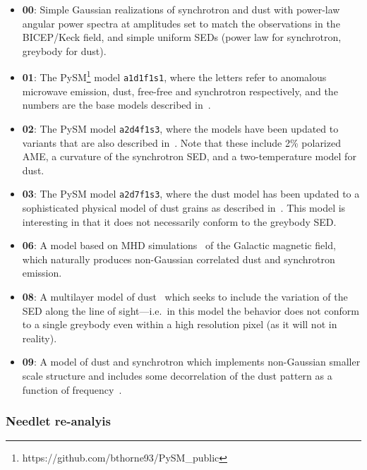 \documentclass[PICOReport.tex]{subfiles}
\begin{document}
\begin{itemize}

\item {\bf 00}: Simple Gaussian realizations of synchrotron and dust with power-law angular power spectra at amplitudes set to match the observations in the BICEP/Keck field, and simple uniform SEDs (power law for synchrotron, greybody for dust).

\item {\bf 01}: The PySM\footnote{https://github.com/bthorne93/PySM\_public} model {\tt a1d1f1s1}, where the letters refer to anomalous microwave emission, dust, free-free and synchrotron respectively, and the numbers are the base models described in~\cite{Thorne:2016ifb}.

\item {\bf 02}: The PySM model {\tt a2d4f1s3}, where the models have been updated to variants that are also described in~\cite{Thorne:2016ifb}.  Note that these include 2\% polarized AME, a curvature of the synchrotron SED, and a two-temperature model for dust.

\item {\bf 03}: The PySM model {\tt a2d7f1s3}, where the dust model has been updated to a sophisticated physical model of dust grains as described in~\cite{Hensley:2015}.
This model is interesting in that it does not necessarily conform to the greybody SED.

\item {\bf 06}: A model based on MHD simulations~\citep{Kritsuk:2017} of the Galactic magnetic field, which naturally produces non-Gaussian correlated dust and synchrotron emission.

\item {\bf 08}: A multilayer model of dust~\citep{Martinez:2017}
which seeks to include the variation of
the SED along the line of sight---i.e.\ in this model the behavior does not
conform to a single greybody even within a high resolution pixel (as it will
not in reality).

\item {\bf 09}: A model of dust and synchrotron which implements non-Gaussian
smaller scale structure and includes some decorrelation of the dust
pattern as a function of frequency~\citep{Vansyngel:2016}.

\end{itemize}

\subsubsection{Needlet re-analyis}
\end{document}
